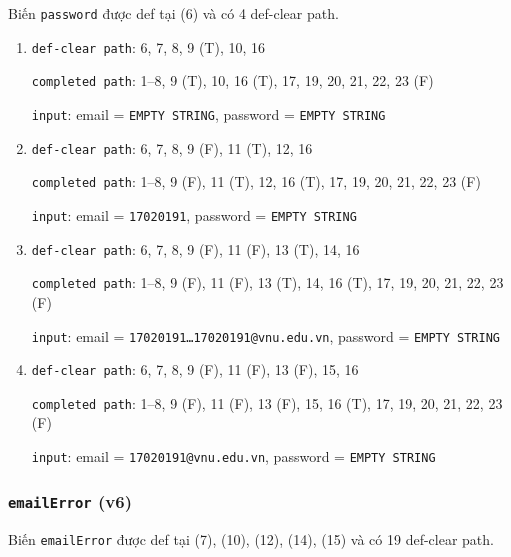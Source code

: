 \documentclass{article}
\begin{document}
\par Biến \texttt{password} được def tại (6) và có 4 def-clear path.

\begin{enumerate}
    \item \texttt{def-clear path}: 6, 7, 8, 9 (T), 10, 16
          \par \texttt{completed path}: 1--8, 9 (T), 10, 16 (T), 17, 19, 20, 21, 22, 23 (F)
          \par \texttt{input}: email = \texttt{EMPTY STRING}, password = \texttt{EMPTY STRING}

    \item \texttt{def-clear path}: 6, 7, 8, 9 (F), 11 (T), 12, 16
          \par \texttt{completed path}: 1--8, 9 (F), 11 (T), 12, 16 (T), 17, 19, 20, 21, 22, 23 (F)
          \par \texttt{input}: email = \texttt{17020191}, password = \texttt{EMPTY STRING}

    \item \texttt{def-clear path}: 6, 7, 8, 9 (F), 11 (F), 13 (T), 14, 16
          \par \texttt{completed path}: 1--8, 9 (F), 11 (F), 13 (T), 14, 16 (T), 17, 19, 20, 21, 22, 23 (F)
          \par \texttt{input}: email = \texttt{17020191\ldots17020191@vnu.edu.vn}, password = \texttt{EMPTY STRING}

    \item \texttt{def-clear path}: 6, 7, 8, 9 (F), 11 (F), 13 (F), 15, 16
          \par \texttt{completed path}: 1--8, 9 (F), 11 (F), 13 (F), 15, 16 (T), 17, 19, 20, 21, 22, 23 (F)
          \par \texttt{input}: email = \texttt{17020191@vnu.edu.vn}, password = \texttt{EMPTY STRING}
\end{enumerate}

\subsubsection*{\texttt{emailError} (v6)}

\par Biến \texttt{emailError} được def tại (7), (10), (12), (14), (15) và có 19 def-clear path.
\end{document}
